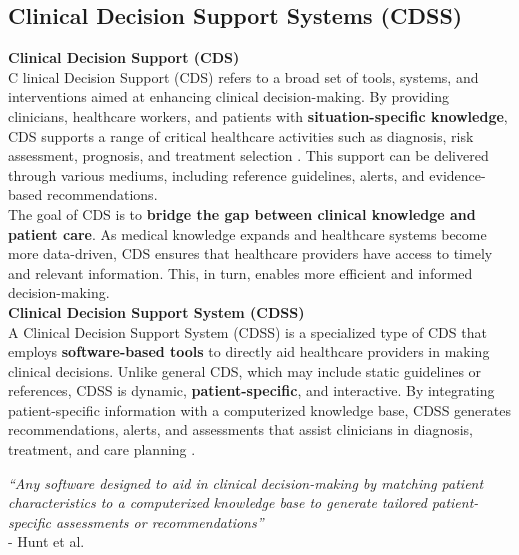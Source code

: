 \subsection{Clinical Decision Support Systems (CDSS)}
\textcolor{TUMBlue}{\textbf{Clinical Decision Support (CDS)}}\\
\noindent \lettrine{C}{ }linical Decision Support (CDS) refers to a broad set of tools, systems, and interventions aimed at enhancing clinical decision-making. By providing clinicians, healthcare workers, and patients with \textcolor{TUMRed}{\textbf{situation-specific knowledge}}, CDS supports a range of critical healthcare activities such as diagnosis, risk assessment, prognosis, and treatment selection \cite{osheroff2007roadmap}. This support can be delivered through various mediums, including reference guidelines, alerts, and evidence-based recommendations.\\[\baselineskip]

\noindent The goal of CDS is to \textcolor{TUMRed}{\textbf{bridge the gap between clinical knowledge and patient care}}. As medical knowledge expands and healthcare systems become more data-driven, CDS ensures that healthcare providers have access to timely and relevant information. This, in turn, enables more efficient and informed decision-making.\\[\baselineskip]

\noindent \textcolor{TUMBlue}{\textbf{Clinical Decision Support System (CDSS)}}\\
A Clinical Decision Support System (CDSS) is a specialized type of CDS that employs \textcolor{TUMRed}{\textbf{software-based tools}} to directly aid healthcare providers in making clinical decisions. Unlike general CDS, which may include static guidelines or references, CDSS is dynamic, \textcolor{TUMRed}{\textbf{patient-specific}}, and interactive. By integrating patient-specific information with a computerized knowledge base, CDSS generates recommendations, alerts, and assessments that assist clinicians in diagnosis, treatment, and care planning \cite{hunt1998effects}.

\begin{mdframed}[backgroundcolor=black!10]
    \centering
    \textit{“Any software designed to aid in clinical decision-making by matching patient characteristics to a computerized knowledge base to generate tailored patient-specific assessments or recommendations”}\\
    \flushright
    -  Hunt et al. \cite{hunt1998effects}
\end{mdframed}

